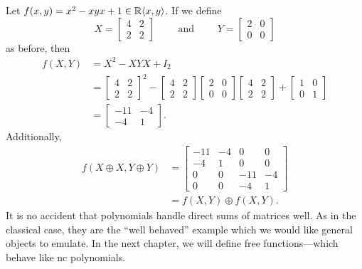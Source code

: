 \begin{example}%
\label{ex:multivareval}
  Let \(f(x,y) = x^2-xyx +1 \in \mathbb{R} \langle x,y \rangle  \). If we define
  \[
    X = \begin{bmatrix} 4 &2\\2&2 \end{bmatrix}  \qquad \text{ and } \qquad Y =\begin{bmatrix} 2&0\\0&0 \end{bmatrix}
  \]
  as before, then
  \begin{align*}
    f(X,Y) &= X^2 - XYX + I_2 \\
           &= \begin{bmatrix} 4 &2\\2&2 \end{bmatrix}^2
             -\begin{bmatrix} 4 &2\\2&2 \end{bmatrix}\begin{bmatrix} 2&0\\0&0 \end{bmatrix}\begin{bmatrix} 4 &2\\2&2 \end{bmatrix}
             +\begin{bmatrix} 1&0\\0&1 \end{bmatrix} \\
           &= \begin{bmatrix} -11&-4\\-4&1 \end{bmatrix}.
  \end{align*}
  Additionally,
  \begin{align*}
    f(X\oplus X,Y\oplus Y) &= \begin{bmatrix} -11&-4&0&0\\-4&1&0&0 \\ 0&0&-11&-4 \\ 0&0&-4&1 \end{bmatrix} \\
    &= f(X,Y) \oplus f(X,Y).
  \end{align*}
  It is no accident that polynomials handle direct sums of matrices well. As in
  the classical case, they are the ``well behaved'' example which we would like
  general objects to emulate. In the next chapter, we will define
  free functions---which behave like nc polynomials.
\end{example}

